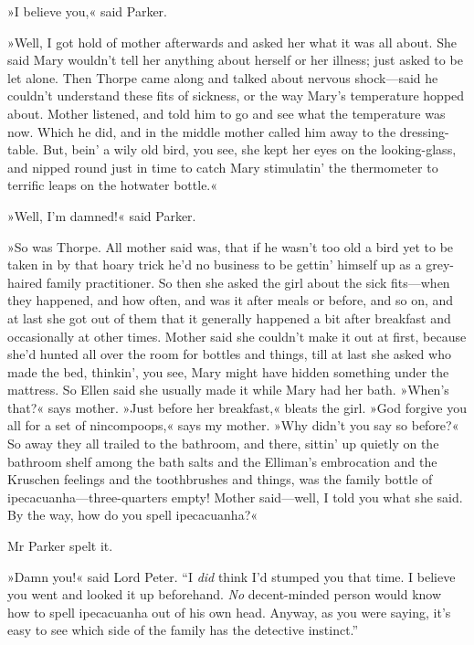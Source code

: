 »I believe you,« said Parker.

»Well, I got hold of mother afterwards and asked her what it was all about. She said Mary wouldn't tell her anything about herself or her illness; just asked to be let alone. Then Thorpe came along and talked about nervous shock\allowbreak---\allowbreak said he couldn't understand these fits of sickness, or the way Mary's temperature hopped about. Mother listened, and told him to go and see what the temperature was now. Which he did, and in the middle mother called him away to the dressing-table. But, bein' a wily old bird, you see, she kept her eyes on the looking-glass, and nipped round just in time to catch Mary stimulatin' the thermometer to terrific leaps on the hotwater bottle.«

»Well, I'm damned!« said Parker.

»So was Thorpe. All mother said was, that if he wasn't too old a bird yet to be taken in by that hoary trick he'd no business to be gettin' himself up as a grey-haired family practitioner. So then she asked the girl about the sick fits\allowbreak---\allowbreak when they happened, and how often, and was it after meals or before, and so on, and at last she got out of them that it generally happened a bit after breakfast and occasionally at other times. Mother said she couldn't make it out at first, because she'd hunted all over the room for bottles and things, till at last she asked who made the bed, thinkin', you see, Mary might have hidden something under the mattress. So Ellen said she usually made it while Mary had her bath. »When's that?« says mother. »Just before her breakfast,« bleats the girl. »God forgive you all for a set of nincompoops,« says my mother. »Why didn't you say so before?« So away they all trailed to the bathroom, and there, sittin' up quietly on the bathroom shelf among the bath salts and the Elliman's embrocation and the Kruschen feelings and the toothbrushes and things, was the family bottle of ipecacuanha\allowbreak---\allowbreak three-quarters empty! Mother said\allowbreak---\allowbreak well, I told you what she said. By the way, how do you spell ipecacuanha?«

Mr Parker spelt it.

»Damn you!« said Lord Peter. \enquote{I \textit{did} think I'd stumped you that time.  I believe you went and looked it up beforehand. \textit{No} decent-minded person would know how to spell ipecacuanha out of his own head. Anyway, as you were saying, it's easy to see which side of the family has the detective instinct.}

